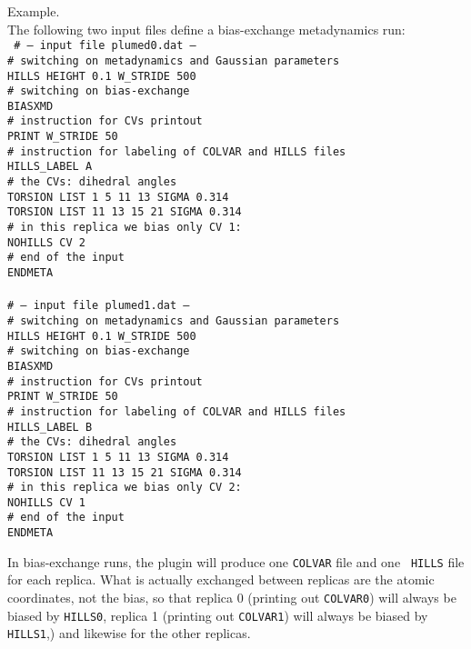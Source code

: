 \documentclass[12pt,fleqn]{report}
\newcommand{\esempio}[1]{
\vspace{10pt}
\begin{flushright}
\colorbox{light-gray}{
   \begin{minipage}{13cm}
       \scriptsize{
{\fontfamily{phv} \fontseries{b}
 \selectfont Example. \\
 \fontseries{m} \selectfont #1 } }
\end{minipage}}
\end{flushright}
\vspace{20pt}
}
\begin{document}
\esempio{The following two input files define a bias-exchange metadynamics run: \vspace{10pt} \\
{\tt 
\# --- input file plumed0.dat ---\\
\# switching on metadynamics and Gaussian  parameters \\
HILLS HEIGHT 0.1 W\_STRIDE 500 \\
\# switching on bias-exchange \\
BIASXMD \\
\# instruction for CVs printout \\
PRINT W\_STRIDE 50 \\
\# instruction for labeling of COLVAR and HILLS files \\
HILLS\_LABEL A \\
\# the CVs: dihedral angles \\
TORSION LIST  1  5 11 13 SIGMA 0.314 \\
TORSION LIST 11 13 15 21 SIGMA 0.314 \\
\# in this replica we bias only CV 1: \\
NOHILLS CV 2\\
\# end of the input \\
ENDMETA \\ 
\vspace{10pt}\\
\# --- input file plumed1.dat ---\\
\# switching on metadynamics and Gaussian  parameters \\
HILLS HEIGHT 0.1 W\_STRIDE 500 \\
\# switching on bias-exchange \\
BIASXMD \\
\# instruction for CVs printout \\
PRINT W\_STRIDE 50 \\
\# instruction for labeling of COLVAR and HILLS files \\
HILLS\_LABEL B \\
\# the CVs: dihedral angles \\
TORSION LIST  1  5 11 13 SIGMA 0.314 \\
TORSION LIST 11 13 15 21 SIGMA 0.314 \\
\# in this replica we bias only CV 2: \\
NOHILLS CV 1\\
\# end of the input \\
ENDMETA  }
}

In bias-exchange runs, the plugin will produce one {\tt COLVAR} file and one {\tt
HILLS} file for each replica. What is actually exchanged between replicas are the atomic
coordinates, not the bias, so that replica 0 (printing out {\tt COLVAR0}) will always be biased by {\tt HILLS0}, 
replica 1 (printing out {\tt COLVAR1}) will always be biased by {\tt HILLS1},) and likewise for the other replicas.
\end{document}
